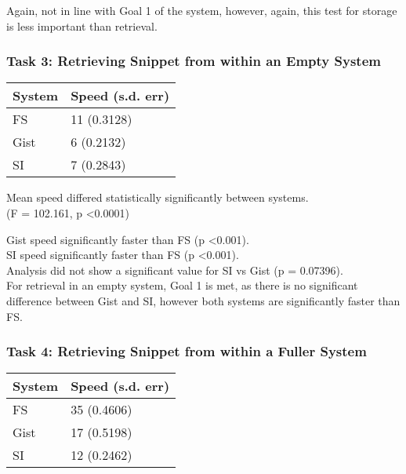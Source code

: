 Again, not in line with Goal 1 of the system, however, again, this test for storage is less important than retrieval.

\subsubsection{Task 3: Retrieving Snippet from within an Empty System}
\begin{table}[H]
\label{speedtabletask3}
\begin{tabular}{ll}
\hline
\textbf{System} & \textbf{Speed (s.d. err)} \\ \hline
FS              & 11 (0.3128)     \\ 
Gist            & 6 (0.2132)     \\ 
SI              & 7 (0.2843)     \\ \hline
\end{tabular}
\end{table}

Mean speed differed statistically significantly between systems. \\
(F = 102.161, p \textless 0.0001)

Gist speed significantly faster than FS (p \textless 0.001). \\
SI speed significantly faster than FS (p \textless 0.001). \\
Analysis did not show a significant value for SI vs Gist (p = 0.07396). \\

For retrieval in an empty system, Goal 1 is met, as there is no significant difference between Gist and SI, however both systems are significantly faster than FS.

\subsubsection{Task 4: Retrieving Snippet from within a Fuller System}
\begin{table}[H]
\label{speedtabletask4}
\begin{tabular}{ll}
\hline
\textbf{System} & \textbf{Speed (s.d. err)} \\ \hline
FS              & 35 (0.4606)     \\ 
Gist            & 17 (0.5198)     \\ 
SI              & 12 (0.2462)     \\ \hline
\end{tabular}
\end{table}

